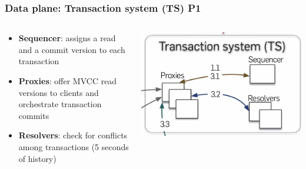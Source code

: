 \begin{frame}
    \frametitle{Data plane: Transaction system (TS) P1}
    \begin{columns}
        \begin{column}{0.5\textwidth}
        \begin{itemize}
    \item \textbf{Sequencer}: assigns a read and a commit version to each transaction
    \item \textbf{Proxies}: offer MVCC read versions to clients and orchestrate transaction commits
    \item \textbf{Resolvers}: check for conflicts among transactions (5 seconds of history)
   \end{itemize}
        
        \end{column}
        \begin{column}{0.5\textwidth}
            \centering
            \includegraphics[width=\textwidth]{img/2-Architecture/Transaction System.png}
        \end{column}
    \end{columns}
\end{frame}




	
